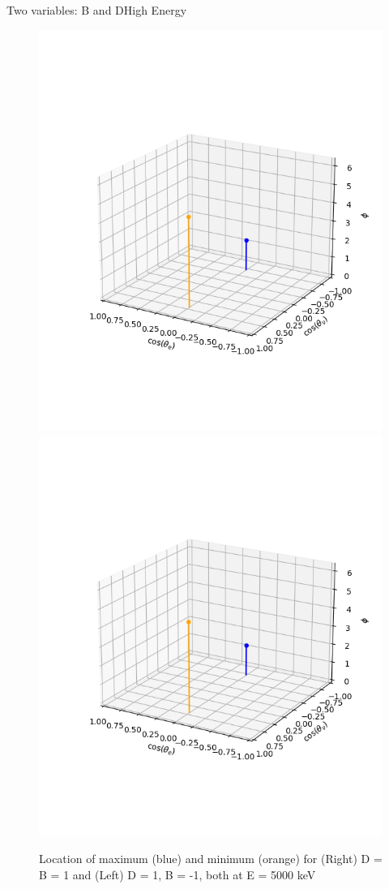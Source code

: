\documentclass{beamer}
\begin{document}
\begin{frame}{Two variables: B and D}{High Energy}
	\begin{figure}
		\centering
		\includegraphics[width=0.4\paperwidth]{plots/posD_negB_hiE_max_min}
		\includegraphics[width=0.4\paperwidth]{plots/posD_negB_hiE_max_min}
		\caption{Location of maximum (blue) and minimum (orange) for (Right) D = B = 1 and (Left) D = 1, B = -1, both at E = 5000 keV}
	\end{figure}
\end{frame}
\end{document}
